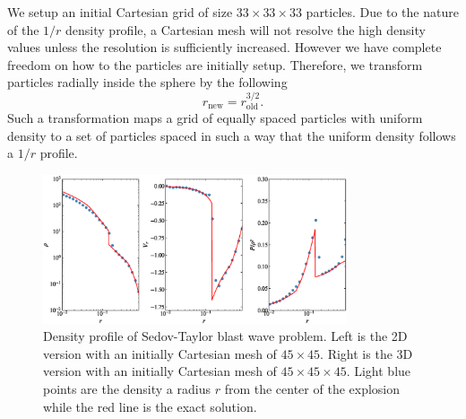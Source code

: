 We setup an initial Cartesian grid of size $33\times 33\times 33$ particles. Due to the nature
of the $1/r$ density profile, a Cartesian mesh will not resolve the high density values unless
the resolution is sufficiently increased. However we have complete freedom on how to the particles
are initially setup. Therefore, we transform particles radially inside the sphere by the following
\begin{equation}
    r_{\mathrm{new}} = r_{\mathrm{old}}^{3/2}.
\end{equation}
Such a transformation maps a grid of equally spaced particles with uniform density to
a set of particles spaced in such a way that the uniform density follows a $1/r$ profile. 
\begin{figure}
    \begin{center}
        \includegraphics[width=0.8\textwidth]{figures/evrard.eps}
        \caption{Density profile of Sedov-Taylor blast wave problem. Left is the 2D version with an initially
        Cartesian mesh of $45 \times 45$. Right is the 3D version with an initially Cartesian mesh of 
        $45 \times 45 \times 45$. Light blue points are the density a radius $r$ from the center of the explosion
        while the red line is the exact solution.}
        \label{fig.evrard}
    \end{center}
\end{figure}

